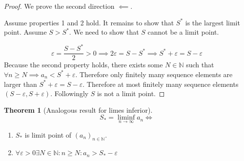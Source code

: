 \documentclass[a4paper,landscape,twocolumn]{article}
\theoremstyle{definition}
\newtheorem{theorem}{Theorem}
\newcommand\seq[1]{{\left(#1\right)}_{n \in \mathbb N}}
\begin{document}
\begin{proof}
  We prove the second direction $\impliedby$.

  Assume properties 1 and 2 hold. It remains to show that $S^*$ is the largest limit point.
  Assume $S > S^*$. We need to show that $S$ cannot be a limit point.

  \[
    \varepsilon = \frac{S - S^*}{2} > 0
    \implies 2\varepsilon = S - S^*
    \implies S^* + \varepsilon = S - \varepsilon
  \]
  Because the second property holds, there exists some $N \in \mathbb N$ such that
  $\forall n \geq N \implies a_n < S^* + \varepsilon$. Therefore only finitely many
  sequence elements are larger than $S^* + \varepsilon = S - \varepsilon$.
  Therefore at most finitely many sequence elements $(S - \varepsilon, S + \varepsilon)$.
  Followingly $S$ is not a limit point.
\end{proof}

\begin{theorem}[Analogous result for limes inferior]
  \[ S_* = \liminf_{n\to\infty} a_n \iff \]
  \begin{enumerate}
    \item $S_*$ is limit point of $\seq{a_n}$.
    \item $\forall \varepsilon > 0 \exists N \in \mathbb N: n \geq N: a_n > S_* - \varepsilon$
  \end{enumerate}
\end{theorem}
\end{document}
